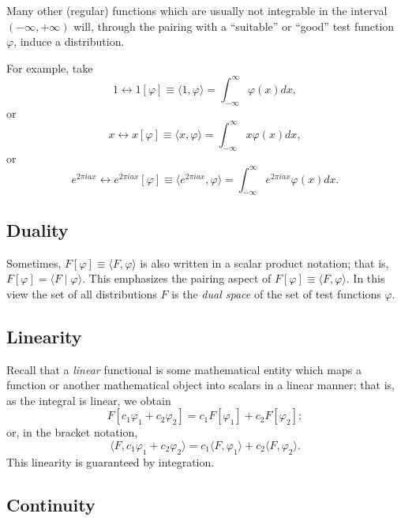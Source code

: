 Many other (regular) functions which are usually not integrable in the interval
$( -\infty , +\infty )$ will, through the pairing with a
``suitable'' or ``good'' test function $\varphi$,
induce a distribution.

{
\color{blue}
\bexample
For example, take
$$1 \longleftrightarrow 1 [\varphi ]\equiv \langle 1 , \varphi \rangle
=\int_{-\infty}^\infty
\varphi (x)
dx  , $$
or
$$x \longleftrightarrow x [\varphi ]\equiv \langle x , \varphi \rangle =\int_{-\infty}^\infty
x\varphi (x)
dx,$$
or
$$e^{2\pi i ax} \longleftrightarrow e^{2\pi i ax} [\varphi ]\equiv \langle e^{2\pi i ax}  ,
\varphi \rangle
=\int_{-\infty}^\infty
e^{2\pi i ax} \varphi (x)
dx  .$$
\eexample
}

\subsection{Duality}

Sometimes, $F[\varphi ]\equiv \langle F , \varphi \rangle $   is also written in a scalar product notation; that is,
$F[\varphi] =\langle F \mid \varphi \rangle$.
This emphasizes the pairing aspect of $F[\varphi ]\equiv \langle F , \varphi \rangle $.
In this view the set of all distributions $F$ is the {\em dual space} of the set of test functions $\varphi$.


\subsection{Linearity}


Recall that a {\em linear} functional is some mathematical entity which maps a function or another mathematical object
into scalars in a linear manner; that is, as the integral is linear, we obtain
\begin{equation}
F[c_1\varphi_1+c_2\varphi_2 ]=
c_1F[\varphi_1]  +
c_2F[\varphi_2];
\end{equation}
or, in the bracket notation,
\begin{equation}
\langle F ,   c_1\varphi_1+c_2\varphi_2 \rangle  =
c_1 \langle F ,  \varphi_1   \rangle  +
c_2 \langle F ,   \varphi_2   \rangle .
\end{equation}
This linearity is guaranteed by integration.

\subsection{Continuity}

